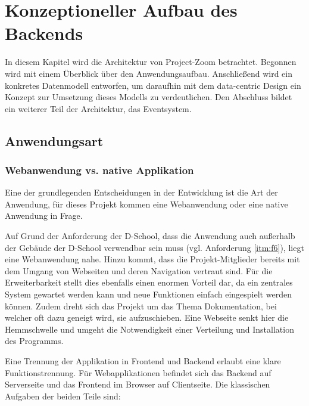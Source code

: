 \chapter{Konzeptioneller Aufbau des Backends}

In diesem Kapitel wird die Architektur von Project-Zoom betrachtet. Begonnen wird mit einem Überblick über den Anwendungsaufbau. Anschließend wird ein konkretes Datenmodell entworfen, um daraufhin mit dem data-centric Design ein Konzept zur Umsetzung dieses Modells zu verdeutlichen.  Den Abschluss bildet ein weiterer Teil der Architektur, das Eventsystem.

\section{Anwendungsart}
\subsection{Webanwendung vs. native Applikation}
Eine der grundlegenden Entscheidungen in der Entwicklung ist die Art der Anwendung, für dieses Projekt kommen eine Webanwendung oder eine native Anwendung in Frage. 

Auf Grund der Anforderung der D-School, dass die Anwendung auch außerhalb der Gebäude der D-School verwendbar sein muss (vgl. Anforderung \ref{itm:f6}), liegt eine Webanwendung nahe. Hinzu kommt, dass die Projekt-Mitglieder bereits mit dem Umgang von Webseiten und deren Navigation vertraut sind. Für die Erweiterbarkeit stellt dies ebenfalls einen enormen Vorteil dar, da ein zentrales System gewartet werden kann und neue Funktionen einfach eingespielt werden können. Zudem dreht sich das Projekt um das Thema Dokumentation, bei welcher oft dazu geneigt wird, sie aufzuschieben. Eine Webseite senkt hier die Hemmschwelle und umgeht die Notwendigkeit einer Verteilung und Installation des Programms.

Eine Trennung der Applikation in Frontend und Backend erlaubt eine klare Funktionstrennung. Für Webapplikationen befindet sich das Backend auf Serverseite und das Frontend im Browser auf Clientseite. Die klassischen Aufgaben der beiden Teile sind:

